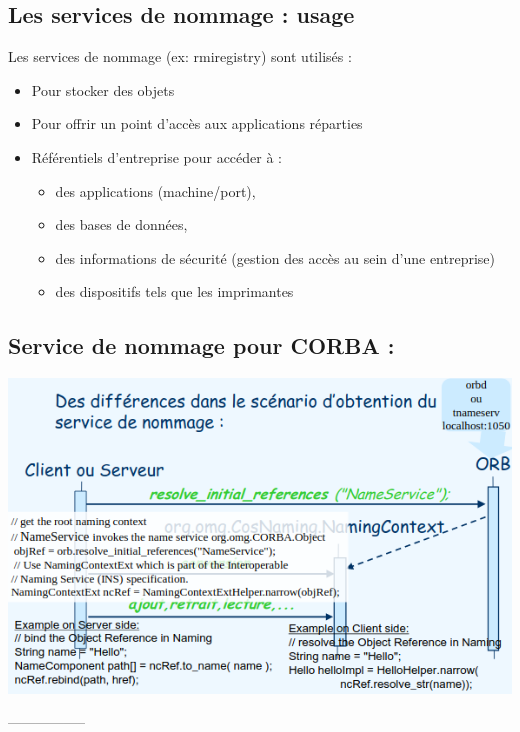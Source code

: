     \subsection{Les services de nommage : usage}

        Les services de nommage (ex: rmiregistry) sont utilisés :
    \begin{itemize}
        \item Pour stocker des objets
        \item Pour offrir un point d'accès aux applications réparties
        \item Référentiels d'entreprise pour accéder à :
            \begin{itemize}[label= ]
                \item des applications (machine/port), 
                \item des bases de données,
                \item des informations de sécurité (gestion des accès au sein d'une entreprise)
                \item des dispositifs tels que les imprimantes
            \end{itemize}
    \end{itemize}

    \subsection{Service de nommage pour CORBA :}
            \begin{center}
                \includegraphics[scale= 0.6]{chap3/corbaname1.png}
            \end{center}


        -----------------%

